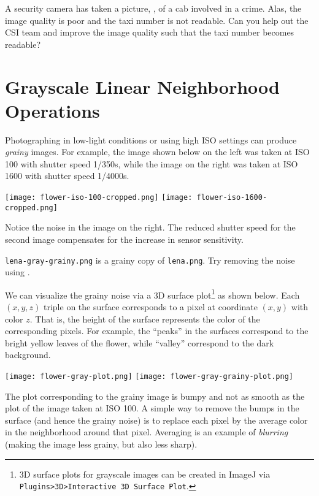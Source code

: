\documentclass{book}
\begin{document}
\begin{exercise}
A security camera has taken a picture, , of a cab involved in a crime. Alas, the image quality is poor and the taxi number is not readable. Can you help out the CSI team and improve the image quality such that the taxi number becomes readable?
\end{exercise}

\section{Grayscale Linear Neighborhood Operations}
Photographing in low-light conditions or using high ISO settings can produce \emph{grainy} images. For example, the image shown below on the left was taken at ISO 100 with shutter speed 1/350s, while the image on the right was taken at ISO 1600 with shutter speed 1/4000s.
\begin{center}
\texttt{[image: flower-iso-100-cropped.png]}
\texttt{[image: flower-iso-1600-cropped.png]}
\end{center}

Notice the noise in the image on the right. The reduced shutter speed for the second image compensates for the increase in sensor sensitivity.
\begin{exercise}
\texttt{lena-gray-grainy.png} is a grainy copy of \texttt{lena.png}. Try removing the noise using .
\end{exercise}

We can visualize the grainy noise via a 3D surface plot\footnote{3D surface plots for grayscale images can be created in ImageJ via \texttt{Plugins>3D>Interactive 3D Surface Plot}.} as shown below. Each $(x, y, z)$ triple on the surface corresponds to a pixel at coordinate $(x, y)$ with color $z$. That is, the height of the surface represents the color of the corresponding pixels. For example, the ``peaks'' in the surfaces correspond to the bright yellow leaves of the flower, while ``valley'' correspond to the dark background.
\begin{center}
\texttt{[image: flower-gray-plot.png]}
\texttt{[image: flower-gray-grainy-plot.png]}
\end{center}
The plot corresponding to the grainy image is bumpy and not as smooth as the plot of the image taken at ISO 100. A simple way to remove the bumps in the surface (and hence the grainy noise) is to replace each pixel by the average color in the neighborhood around that pixel. Averaging is an example of \emph{blurring} (making the image less grainy, but also less sharp).
\end{document}
